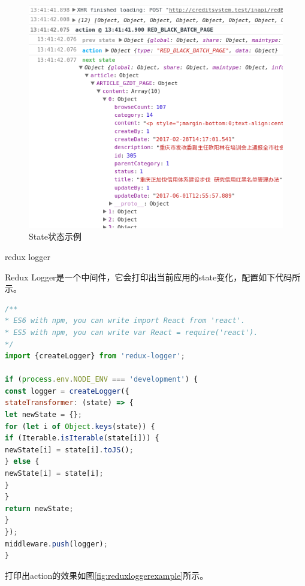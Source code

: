 \documentclass[11pt,fleqn]{book}
\makeatletter
\numberwithin{dummy}{section}
\theoremstyle{ocrenumbox}
\theoremstyle{blacknumex}
\theoremstyle{blacknumbox}
\theoremstyle{ocrenum}
\renewcommand\paragraph{\@startsection{paragraph}{4}{\z@}
	{-2ex \@plus-.2ex \@minus .2ex}
	{.1ex}
	{\normalfont\small\sffamily\bfseries}}
\makeatother
\begin{document}
\begin{figure}[htbp]
	\centering
	\includegraphics[scale=0.6]{statedemo.png}
	\caption{State状态示例}
	\label{fig:statedemo}
\end{figure}



\paragraph{redux logger}

Redux Logger是一个中间件，它会打印出当前应用的state变化，配置如下代码所示。

\begin{lstlisting}[language=Javascript]
/**
* ES6 with npm, you can write import React from 'react'. 
* ES5 with npm, you can write var React = require('react').
*/
import {createLogger} from 'redux-logger';

if (process.env.NODE_ENV === 'development') {
const logger = createLogger({
stateTransformer: (state) => {
let newState = {};
for (let i of Object.keys(state)) {
if (Iterable.isIterable(state[i])) {
newState[i] = state[i].toJS();
} else {
newState[i] = state[i];
}
}
return newState;
}
});
middleware.push(logger);
}
\end{lstlisting}

打印出action的效果如图\ref{fig:reduxloggerexample}所示。
\end{document}

